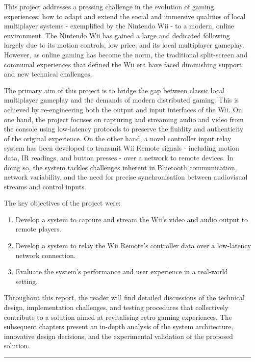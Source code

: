 \label{chapter:introduction}

This project addresses a pressing challenge in the evolution of gaming experiences: how to adapt and extend the social and immersive qualities of local multiplayer systems - exemplified by the Nintendo Wii - to a modern, online environment. The Nintendo Wii has gained a large and dedicated following largely due to its motion controls, low price, and its local multiplayer gameplay. However, as online gaming has become the norm, the traditional split-screen and communal experiences that defined the Wii era have faced diminishing support and new technical challenges.

The primary aim of this project is to bridge the gap between classic local multiplayer gameplay and the demands of modern distributed gaming. This is achieved by re-engineering both the output and input interfaces of the Wii. On one hand, the project focuses on capturing and streaming audio and video from the console using low-latency protocols to preserve the fluidity and authenticity of the original experience. On the other hand, a novel controller input relay system has been developed to transmit Wii Remote signals - including motion data, IR readings, and button presses - over a network to remote devices. In doing so, the system tackles challenges inherent in Bluetooth communication, network variability, and the need for precise synchronisation between audiovisual streams and control inputs.

The key objectives of the project were:
\begin{enumerate}
\item  Develop a system to capture and stream the Wii’s video and audio output to remote players.
\item Develop a system to relay the Wii Remote’s controller data over a low-latency network connection.
\item Evaluate the system’s performance and user experience in a real-world setting.
\end{enumerate}

Throughout this report, the reader will find detailed discussions of the technical design, implementation challenges, and testing procedures that collectively contribute to a solution aimed at revitalising retro gaming experiences. The subsequent chapters present an in-depth analysis of the system architecture, innovative design decisions, and the experimental validation of the proposed solution.


\begin{center}
	\noindent\rule{8cm}{0.4pt}
\end{center}



